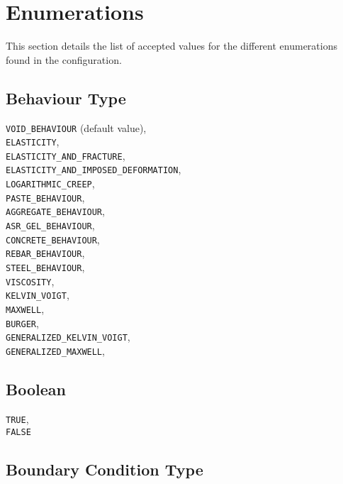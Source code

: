 \documentclass[10pt]{article}
\begin{document}
\section{Enumerations}

This section details the list of accepted values for the different enumerations found in the configuration.

\subsection{Behaviour Type}

	\verb+VOID_BEHAVIOUR+ (default value),\\
	\verb+ELASTICITY+,\\
	\verb+ELASTICITY_AND_FRACTURE+,\\
	\verb+ELASTICITY_AND_IMPOSED_DEFORMATION+,\\
	\verb+LOGARITHMIC_CREEP+,\\
	\verb+PASTE_BEHAVIOUR+,\\
	\verb+AGGREGATE_BEHAVIOUR+,\\
	\verb+ASR_GEL_BEHAVIOUR+,\\
	\verb+CONCRETE_BEHAVIOUR+,\\
	\verb+REBAR_BEHAVIOUR+,\\
	\verb+STEEL_BEHAVIOUR+,\\
	\verb+VISCOSITY+,\\
	\verb+KELVIN_VOIGT+,\\
	\verb+MAXWELL+,\\
	\verb+BURGER+,\\
	\verb+GENERALIZED_KELVIN_VOIGT+,\\
	\verb+GENERALIZED_MAXWELL+,\\
	
\subsection{Boolean}
	\verb+TRUE+,\\
	\verb+FALSE+


\subsection{Boundary Condition Type}
\end{document}
